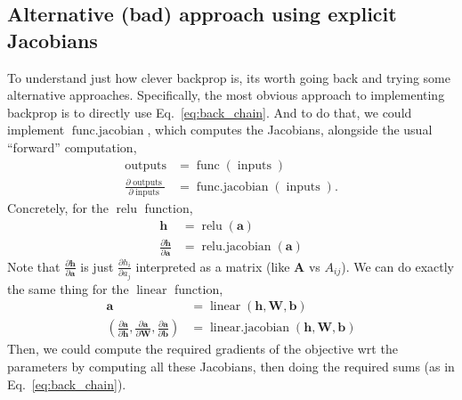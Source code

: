 \documentclass{article}
\newcommand{\dd}[2][]{\frac{\partial #1}{\partial #2}}
\newcommand{\dt}[2][]{\frac{d #1}{d #2}}
\newcommand{\dL}{\dt[\L]}
\newcommand{\bracket}[3]{\left#1 #3 \right#2}
\renewcommand{\b}{\bracket{(}{)}}
\newcommand{\h}{\mathbf{h}}
\newcommand{\bv}{\mathbf{b}}
\renewcommand{\a}{\mathbf{a}}
\newcommand{\W}{\mathbf{W}}
\renewcommand{\L}{\mathcal{L}}
\newcommand{\linear}{\operatorname{linear}}
\newcommand{\relu}{\operatorname{relu}}
\newcommand{\func}{\operatorname{func}}
\newcommand{\funcjac}{\operatorname{func{.}jacobian}}
\newcommand{\inputs}{\operatorname{inputs}}
\newcommand{\outputs}{\operatorname{outputs}}
\newcommand{\linearjac}{\operatorname{linear{.}jacobian}}
\newcommand{\relujac}{\operatorname{relu{.}jacobian}}
\begin{document}
\subsection{Alternative (bad) approach using explicit Jacobians}

To understand just how clever backprop is, its worth going back and trying some alternative approaches.
Specifically, the most obvious approach to implementing backprop is to directly use Eq.~\eqref{eq:back_chain}.
And to do that, we could implement $\funcjac$, which computes the Jacobians, alongside the usual ``forward'' computation,
\begin{subequations}
\label{eq:general_jacobian}
\begin{align}
  \outputs &= \func\b{\inputs}\\
  \dd[\outputs]{\inputs} &= \funcjac\b{\inputs}.
\end{align}
\end{subequations}
Concretely, for the $\relu$ function,
\begin{subequations}
\begin{align}
  \h &= \relu\b{\a} \\ 
  \dd[\h]{\a} &= \relujac\b{\a}
\end{align}
\end{subequations}
Note that $\dd[\h]{\a}$ is just $\dd[h_i]{a_j}$ interpreted as a matrix (like $\mathbf{A}$ vs $A_{ij}$).  
%
We can do exactly the same thing for the $\linear$ function,
\begin{subequations}
\begin{align}
  \a &= \linear\b{\h, \W, \bv} \\ 
  \b{\dd[\a]{\h}, \dd[\a]{\W}, \dd[\a]{\bv}} &= \linearjac\b{\h, \W, \bv}
\end{align}
\end{subequations}
Then, we could compute the required gradients of the objective wrt the parameters by computing all these Jacobians, then doing the required sums (as in Eq.~\ref{eq:back_chain}).
\end{document}
